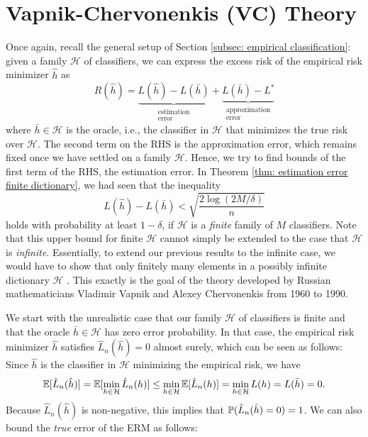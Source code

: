 \chapter{Vapnik-Chervonenkis (VC) Theory}
\label{ch: VC theory}

Once again, recall the general setup of Section \ref{subsec: empirical classification}: given a family $\mathcal{H}$ of classifiers, we can express the excess risk of the empirical risk minimizer $\hat{h}$ as
\[
    R(\hat{h}) = \underbrace{L(\hat{h}) - L(\bar{h})}_{\substack{\text{estimation} \\ \text{error}}} + \underbrace{L(\bar{h}) - L^*}_{\substack{\text{approximation} \\ \text{error}}}
\]
where $\bar{h} \in \mathcal{H}$ is the oracle, i.e., the classifier in $\mathcal{H}$ that minimizes the true risk over $\mathcal{H}$. The second term on the RHS is the approximation error, which remains fixed once we have settled on a family $\mathcal{H}$. Hence, we try to find bounds of the first term of the RHS, the estimation error. In Theorem \ref{thm: estimation error finite dictionary}, we had seen that the inequality
\[
    L(\hat{h}) - L(\bar{h}) < \sqrt{\frac{2 \log(2M / \delta)}{n}}
\]
holds with probability at least $1 - \delta$, if $\mathcal{H}$ is a \emph{finite} family of $M$ classifiers. Note that this upper bound for finite $\mathcal{H}$ cannot simply be extended to the case that $\mathcal{H}$ is \emph{infinite}. Essentially, to extend our previous results to the infinite case, we would have to show that only finitely many elements in a possibly infinite dictionary $\mathcal{H}$ . This exactly is the goal of the theory developed by Russian mathematicians Vladimir Vapnik and Alexey Chervonenkis from 1960 to 1990.

We start with the unrealistic case that our family $\mathcal{H}$ of classifiers is finite and that the oracle $\bar{h} \in \mathcal{H}$ has zero error probability. In that case, the empirical risk minimizer $\hat{h}$ satisfies $\hat{L}_n(\hat{h}) = 0$ almost surely, which can be seen as follows: Since $\hat{h}$ is the classifier in $\mathcal{H}$ minimizing the empirical risk, we have
\[
    \operatorname{\mathbb{E}}[\hat{L}_n(\hat{h})] = \operatorname{\mathbb{E}}[\min_{h \in \mathcal{H}} \hat{L}_n(h)] \leq \min_{h \in \mathcal{H}} \operatorname{\mathbb{E}}[\hat{L}_n(h)] = \min_{h \in \mathcal{H}} L(h) = L(\bar{h}) = 0.
\]
Because $\hat{L}_n(\hat{h})$ is non-negative, this implies that $\operatorname{\mathbb{P}}(\hat{L}_n(\hat{h}) = 0) = 1$. We can also bound the \emph{true} error of the ERM as follows:

